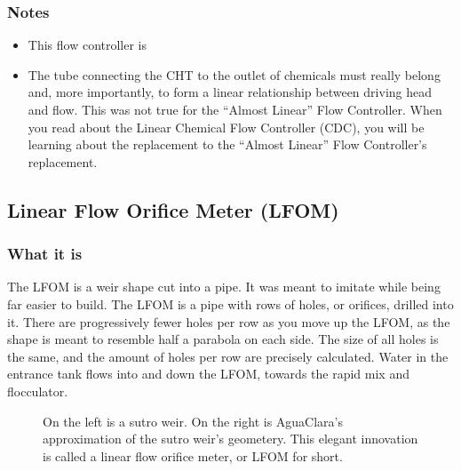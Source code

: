 \documentclass[letterpaper,10pt,english]{sphinxmanual}
\let\sphinxpxdimen\pdfpxdimen\else\newdimen\sphinxpxdimen
\begin{document}
\subsubsection{Notes}
\label{\detokenize{Flow_Control_and_Measurement/FCM_Design:notes}}\begin{itemize}
\item {} 
This flow controller is 

\item {} 
The tube connecting the CHT to the outlet of chemicals must really belong and, more importantly,  to form a linear relationship between driving head and flow. This was not true for the “Almost Linear” Flow Controller. When you read about the Linear Chemical Flow Controller (CDC), you will be learning about the replacement to the “Almost Linear” Flow Controller’s replacement.

\end{itemize}


\subsection{Linear Flow Orifice Meter (LFOM)}
\label{\detokenize{Flow_Control_and_Measurement/FCM_Design:linear-flow-orifice-meter-lfom}}\label{\detokenize{Flow_Control_and_Measurement/FCM_Design:lfom}}

\subsubsection{What it is}
\label{\detokenize{Flow_Control_and_Measurement/FCM_Design:id5}}
The LFOM is a weir shape cut into a pipe. It was meant to imitate  while being far easier to build. The LFOM is a pipe with rows of holes, or orifices, drilled into it. There are progressively fewer holes per row as you move up the LFOM, as the shape is meant to resemble half a parabola on each side. The size of all holes is the same, and the amount of holes per row are precisely calculated. Water in the entrance tank flows into and down the LFOM, towards the rapid mix and flocculator.

\begin{figure}[htbp]
\centering
\capstart

\noindent\sphinxincludegraphics[width=600\sphinxpxdimen]{{sutro_v_lfom}.png}
\caption{On the left is a sutro weir. On the right is AguaClara’s approximation of the sutro weir’s geometery. This elegant innovation is called a linear flow orifice meter, or LFOM for short.}\label{\detokenize{Flow_Control_and_Measurement/FCM_Design:id16}}\label{\detokenize{Flow_Control_and_Measurement/FCM_Design:sutro-v-lfom}}\end{figure}
\end{document}
